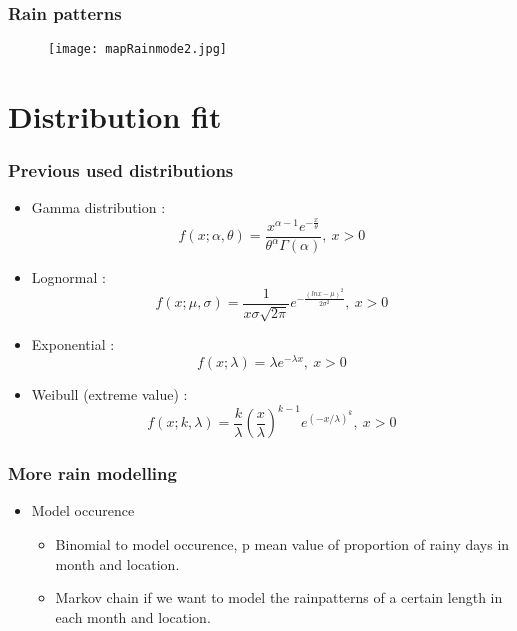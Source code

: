 \documentclass{beamer}
\begin{document}
\begin{frame}
\frametitle{Rain patterns}
\begin{figure}
	\texttt{[image: mapRainmode2.jpg]}
\end{figure}
\end{frame}

\section{Distribution fit}

\begin{frame}
\frametitle{Previous used distributions}
\begin{itemize}
	\item Gamma distribution :
	\begin{equation*}
	f(x ; \alpha, \theta) = \frac{x^{\alpha-1} e^{-\frac{x}{\theta}}}{\theta^\alpha \Gamma(\alpha)}, \ x > 0
	\end{equation*}
	\item Lognormal :
	\begin{equation*}
	f(x ; \mu, \sigma)  = \frac{1}{x\sigma \sqrt{2\pi}} e^{- \frac{(ln x - \mu)^2}{2 \sigma ^2}}, \  x > 0
	\end{equation*}
	\item Exponential :
	\begin{equation*}
	f(x ; \lambda) = \lambda e^{-\lambda x}, \  x> 0
	\end{equation*}
	\item Weibull (extreme value) :
	\begin{equation*}
	f(x ; k, \lambda) = \frac{k}{\lambda}\left(\frac{x}{\lambda}\right)^{k-1}e^{(-x/ \lambda)^k}, \ x> 0
	\end{equation*}
\end{itemize}
\end{frame}

\begin{frame}
\frametitle{More rain modelling}
\begin{itemize}
	\item Model occurence
	\begin{itemize}
		\item Binomial to model occurence, p mean value of proportion of rainy days in month and location.
		\item Markov chain if we want to model the rainpatterns of a certain length in each month and location.
	\end{itemize}
\end{itemize}
\end{frame}
\end{document}
